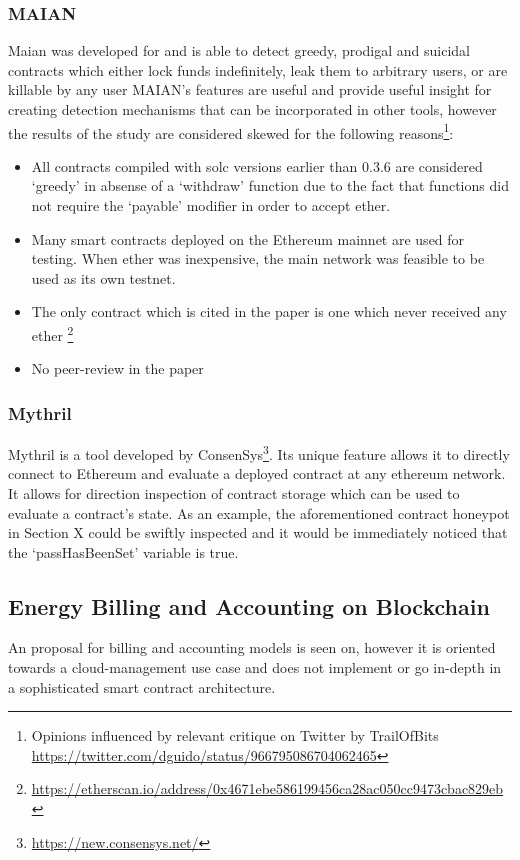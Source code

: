 \subsubsection{MAIAN}
Maian \cite{maian} was developed for \cite{greedyprodigal} and is able to detect greedy, prodigal and suicidal contracts which either lock funds indefinitely, leak them to arbitrary users, or are killable by any user %
MAIAN's features are useful and provide useful insight for creating detection mechanisms that can be incorporated in other tools, however the results of the study are considered skewed for the following reasons\footnote{Opinions influenced by relevant critique on Twitter by TrailOfBits \url{https://twitter.com/dguido/status/966795086704062465}}:
\begin{itemize}
    \item All contracts compiled with solc versions earlier than 0.3.6 are considered `greedy' in absense of a `withdraw' function due to the fact that functions did not require the `payable' modifier in order to accept ether. 
    \item Many smart contracts deployed on the Ethereum mainnet are used for testing. When ether was inexpensive, the main network was feasible to be used as its own testnet.
    \item The only contract which is cited in the paper is one which never  received any ether \footnote{\url{https://etherscan.io/address/0x4671ebe586199456ca28ac050cc9473cbac829eb}}
    \item No peer-review in the paper
\end{itemize}
\subsubsection{Mythril}
Mythril \cite{mythril} is a tool developed by ConsenSys\footnote{\url{https://new.consensys.net/}}. Its unique feature allows it to directly connect to Ethereum and evaluate a deployed contract at any ethereum network. It allows for direction inspection of contract storage which can be used to evaluate a contract's state. As an example, the aforementioned contract honeypot in Section X could be swiftly inspected and it would be immediately noticed that the `passHasBeenSet' variable is true.


\subsection{Energy Billing and Accounting on Blockchain}
An proposal for billing and accounting models is seen on\cite{billaccount}, however it is oriented towards a cloud-management use case and does not implement or go in-depth in a sophisticated smart contract architecture. 


